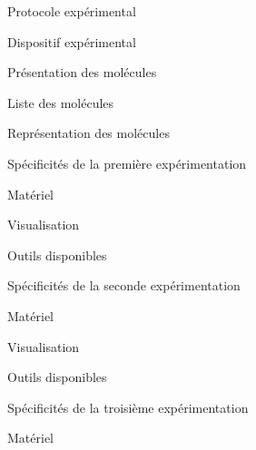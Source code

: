 \documentclass[myfrancais]{mythesis}
\begin{document}
	\myglossary
	\myappendix
	\begin{mychapter}{Protocole expérimental}
		\begin{mysection}{Dispositif expérimental}
			\begin{mysubsection}{Présentation des molécules}
				\begin{mysubsubsection}{Liste des molécules}
				\end{mysubsubsection}
				\begin{mysubsubsection}{Représentation des molécules}
				\end{mysubsubsection}
			\end{mysubsection}
			\begin{mysubsection}{Spécificités de la première expérimentation}
				\begin{mysubsubsection}{Matériel}
				\end{mysubsubsection}
				\begin{mysubsubsection}{Visualisation}
				\end{mysubsubsection}
				\begin{mysubsubsection}{Outils disponibles}
				\end{mysubsubsection}
			\end{mysubsection}
			\begin{mysubsection}{Spécificités de la seconde expérimentation}
				\begin{mysubsubsection}{Matériel}
				\end{mysubsubsection}
				\begin{mysubsubsection}{Visualisation}
				\end{mysubsubsection}
				\begin{mysubsubsection}{Outils disponibles}
				\end{mysubsubsection}
			\end{mysubsection}
			\begin{mysubsection}{Spécificités de la troisième expérimentation}
				\begin{mysubsubsection}{Matériel}
				\end{mysubsubsection}

\end{mysubsection}
\end{mysection}
\end{mychapter}
\end{document}
